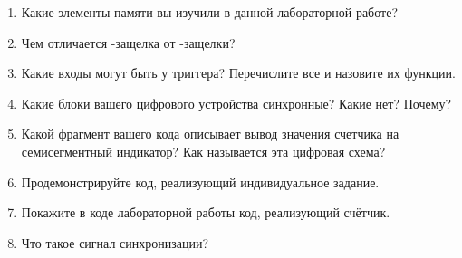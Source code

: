 \begin{enumerate}[noitemsep,topsep=0pt, after=\vspace{2pt}]
  \item Какие элементы памяти вы изучили в данной лабораторной работе?
  \item Чем отличается -защелка от -защелки?
  \item Какие входы могут быть у триггера? Перечислите все и назовите их функции.
  \item Какие блоки вашего цифрового устройства синхронные? Какие нет? Почему?
  \item Какой фрагмент вашего кода описывает вывод значения счетчика на семисегментный индикатор? Как называется эта цифровая схема?
  \item Продемонстрируйте код, реализующий индивидуальное задание.
  \item Покажите в коде лабораторной работы код, реализующий счётчик.
  \item Что такое сигнал синхронизации?
\end{enumerate}
